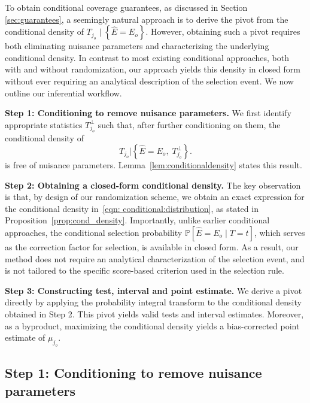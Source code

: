\documentclass[12pt]{article}
\begin{document}
To obtain conditional coverage guarantees, as discussed in Section \ref{sec:guarantees}, a seemingly natural approach is to derive the pivot from the conditional density of $T_{j_o} \mid \left\{\widehat{E}=E_o\right\}$.
However, obtaining such a pivot requires both eliminating nuisance parameters and characterizing the underlying conditional density. 
In contrast to most existing conditional approaches, both with and without randomization, our approach yields this density in closed form without ever requiring an analytical description of the selection event. 
We now outline our inferential workflow.


\noindent\textbf{Step 1: Conditioning to remove nuisance parameters.}
We first identify appropriate statistics $T_{j_o}^\perp$ such that, after further conditioning on them, the conditional density of 
\begin{equation}
\label{eqn: conditional:distribution}
    T_{j_o} \Big\lvert \left\{\widehat{E}=E_o, \; T_{j_o}^\perp\right\}.
\end{equation}
is free of nuisance parameters. 
Lemma~\ref{lem:conditionaldensity} states this result.


\noindent\textbf{Step 2: Obtaining a closed-form conditional density.} 
The key observation is that, by design of our randomization scheme, we obtain an exact expression for the conditional density in~\eqref{eqn: conditional:distribution}, as stated in Proposition~\ref{prop:cond_density}. Importantly, unlike earlier conditional approaches, the conditional selection probability $\mathbb{P}[\widehat E=E_o \mid T=t]$, which serves as the correction factor for selection, is available in closed form.
As a result, our method does not require an analytical characterization of the selection event, and is not tailored to the specific score-based criterion used in the selection rule.


\noindent\textbf{Step 3: Constructing test, interval and point estimate.}
We derive a pivot directly by applying the probability integral transform to the conditional density obtained in Step 2. This pivot yields valid tests and interval estimates. Moreover, as a byproduct, maximizing the conditional density yields a bias-corrected point estimate of $\mu_{j_o}$.


\subsection{Step 1: Conditioning to remove nuisance parameters}
\label{sec:key_stats}
\end{document}
